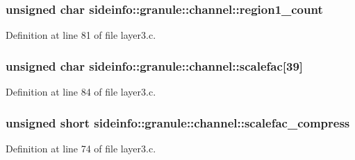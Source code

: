 \subsubsection[{\texorpdfstring{region1\+\_\+count}{region1_count}}]{\setlength{\rightskip}{0pt plus 5cm}unsigned char sideinfo\+::granule\+::channel\+::region1\+\_\+count}\hypertarget{structsideinfo_1_1granule_1_1channel_af29c059b626881786ddf5646ee4c3029}{}\label{structsideinfo_1_1granule_1_1channel_af29c059b626881786ddf5646ee4c3029}


Definition at line 81 of file layer3.\+c.

\subsubsection[{\texorpdfstring{scalefac}{scalefac}}]{\setlength{\rightskip}{0pt plus 5cm}unsigned char sideinfo\+::granule\+::channel\+::scalefac\mbox{[}39\mbox{]}}\hypertarget{structsideinfo_1_1granule_1_1channel_a38713fd50e3d29452f4cb887568e6ebc}{}\label{structsideinfo_1_1granule_1_1channel_a38713fd50e3d29452f4cb887568e6ebc}


Definition at line 84 of file layer3.\+c.

\subsubsection[{\texorpdfstring{scalefac\+\_\+compress}{scalefac_compress}}]{\setlength{\rightskip}{0pt plus 5cm}unsigned short sideinfo\+::granule\+::channel\+::scalefac\+\_\+compress}\hypertarget{structsideinfo_1_1granule_1_1channel_aeecf660a5b7563c665e15c3aaa07440a}{}\label{structsideinfo_1_1granule_1_1channel_aeecf660a5b7563c665e15c3aaa07440a}


Definition at line 74 of file layer3.\+c.

